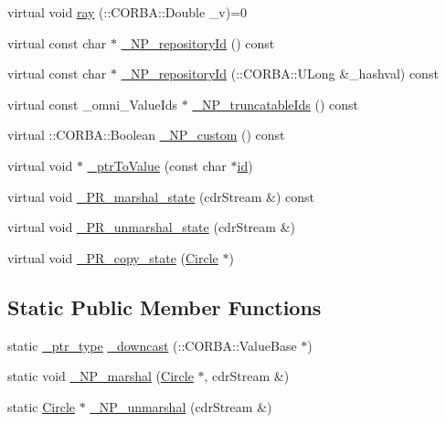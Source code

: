 \begin{DoxyCompactItemize}
\item 
virtual void \hyperlink{class_circle_a850aad5e97721700746efd3d82af1487}{ray} (\+::C\+O\+R\+B\+A\+::\+Double \+\_\+v)=0
\item 
virtual const char $\ast$ \hyperlink{class_circle_aef9e3dad8cb215413d3d9371c21312ba}{\+\_\+\+N\+P\+\_\+repository\+Id} () const 
\item 
virtual const char $\ast$ \hyperlink{class_circle_a2b46a87a83e6e4953bf3cbd507a99e26}{\+\_\+\+N\+P\+\_\+repository\+Id} (\+::C\+O\+R\+B\+A\+::\+U\+Long \&\+\_\+hashval) const 
\item 
virtual const \+\_\+omni\+\_\+\+Value\+Ids $\ast$ \hyperlink{class_circle_aaf148f2aa3a4bc47c990850800897ff9}{\+\_\+\+N\+P\+\_\+truncatable\+Ids} () const 
\item 
virtual \+::C\+O\+R\+B\+A\+::\+Boolean \hyperlink{class_circle_a5c0763ec17a208a2e25796b7714975cf}{\+\_\+\+N\+P\+\_\+custom} () const 
\item 
virtual void $\ast$ \hyperlink{class_circle_a4bcb25e2b518b4674bf81439c8f4ef6a}{\+\_\+ptr\+To\+Value} (const char $\ast$\hyperlink{class_draw_a1bf27c5a59da9002d55936c947dce2cc}{id})
\item 
virtual void \hyperlink{class_circle_af2d05d9a1c7ac75312e9e778b55a5625}{\+\_\+\+P\+R\+\_\+marshal\+\_\+state} (cdr\+Stream \&) const 
\item 
virtual void \hyperlink{class_circle_a7756078d5d749f39cd6620de130cfd0e}{\+\_\+\+P\+R\+\_\+unmarshal\+\_\+state} (cdr\+Stream \&)
\item 
virtual void \hyperlink{class_circle_a5a2cf4d7bb6f06052c34ecf0467cbe69}{\+\_\+\+P\+R\+\_\+copy\+\_\+state} (\hyperlink{class_circle}{Circle} $\ast$)
\end{DoxyCompactItemize}
\subsection*{Static Public Member Functions}
\begin{DoxyCompactItemize}
\item 
static \hyperlink{class_draw_a5164256572b3c4123ceecd1897c248dd}{\+\_\+ptr\+\_\+type} \hyperlink{class_circle_a264dbd97a8e3819388a008d722aab612}{\+\_\+downcast} (\+::C\+O\+R\+B\+A\+::\+Value\+Base $\ast$)
\item 
static void \hyperlink{class_circle_a6b682a01a8bf70dad668ec3f1fc1c5ef}{\+\_\+\+N\+P\+\_\+marshal} (\hyperlink{class_circle}{Circle} $\ast$, cdr\+Stream \&)
\item 
static \hyperlink{class_circle}{Circle} $\ast$ \hyperlink{class_circle_ae8e42637a424b531bcba7cb48fc398ef}{\+\_\+\+N\+P\+\_\+unmarshal} (cdr\+Stream \&)
\end{DoxyCompactItemize}
